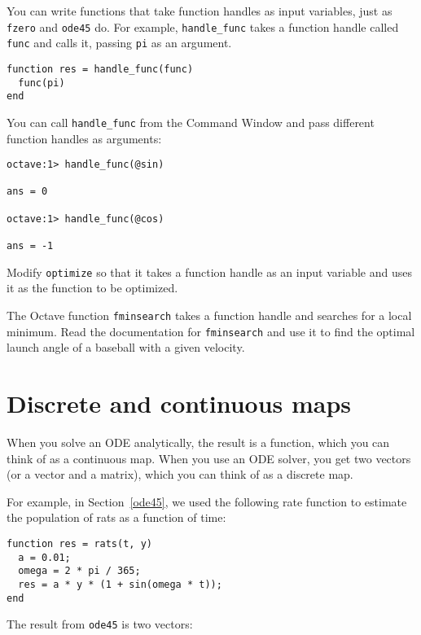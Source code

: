 \begin{ex}
You can write functions that take function handles as input
variables, just as {\tt fzero} and {\tt ode45} do.
For example, {\tt handle\_func} takes a function handle called
{\tt func} and calls it, passing {\tt pi} as an argument.

\begin{verbatim}
function res = handle_func(func)
  func(pi)
end
\end{verbatim}

You can call {\tt handle\_func} from the Command Window and pass
different function handles as arguments:

\begin{verbatim}
octave:1> handle_func(@sin)

ans = 0

octave:1> handle_func(@cos)

ans = -1
\end{verbatim}

Modify {\tt optimize} so that it takes a function handle
as an input variable and uses it as the function to be
optimized.
\end{ex}

\begin{ex}
The Octave function {\tt fminsearch} takes a function handle
and searches for a local minimum. Read the documentation for
{\tt fminsearch} and use it to find the optimal launch angle
of a baseball with a given velocity.
\end{ex}


\section{Discrete and continuous maps}

When you solve an ODE analytically, the result is a function,
which you can think of as a continuous map. When you use an
ODE solver, you get two vectors (or a vector and a matrix), which
you can think of as a discrete map.

For example, in Section~\ref{ode45}, we used the following rate
function to estimate the population of rats as a function of time:

\begin{verbatim}
function res = rats(t, y)
  a = 0.01;
  omega = 2 * pi / 365;
  res = a * y * (1 + sin(omega * t));
end
\end{verbatim}

The result from {\tt ode45} is two vectors:


